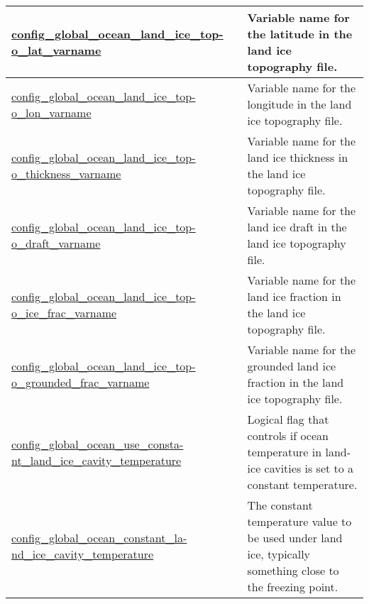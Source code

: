 {\begin{center}
\begin{longtable}{| p{2.0in} || p{4.0in} |}
    \hline
    \hyperref[subsec:nm_sec_config_global_ocean_land_ice_topo_lat_varname]{config\_global\_ocean\_land\_ice\_top-}\hyperref[subsec:nm_sec_config_global_ocean_land_ice_topo_lat_varname]{o\_lat\_varname}& Variable name for the latitude in the land ice topography file. \\
    \hline
    \hyperref[subsec:nm_sec_config_global_ocean_land_ice_topo_lon_varname]{config\_global\_ocean\_land\_ice\_top-}\hyperref[subsec:nm_sec_config_global_ocean_land_ice_topo_lon_varname]{o\_lon\_varname}& Variable name for the longitude in the land ice topography file. \\
    \hline
    \hyperref[subsec:nm_sec_config_global_ocean_land_ice_topo_thickness_varname]{config\_global\_ocean\_land\_ice\_top-}\hyperref[subsec:nm_sec_config_global_ocean_land_ice_topo_thickness_varname]{o\_thickness\_varname}& Variable name for the land ice thickness in the land ice topography file. \\
    \hline
    \hyperref[subsec:nm_sec_config_global_ocean_land_ice_topo_draft_varname]{config\_global\_ocean\_land\_ice\_top-}\hyperref[subsec:nm_sec_config_global_ocean_land_ice_topo_draft_varname]{o\_draft\_varname}& Variable name for the land ice draft in the land ice topography file. \\
    \hline
    \hyperref[subsec:nm_sec_config_global_ocean_land_ice_topo_ice_frac_varname]{config\_global\_ocean\_land\_ice\_top-}\hyperref[subsec:nm_sec_config_global_ocean_land_ice_topo_ice_frac_varname]{o\_ice\_frac\_varname}& Variable name for the land ice fraction in the land ice topography file. \\
    \hline
    \hyperref[subsec:nm_sec_config_global_ocean_land_ice_topo_grounded_frac_varname]{config\_global\_ocean\_land\_ice\_top-}\hyperref[subsec:nm_sec_config_global_ocean_land_ice_topo_grounded_frac_varname]{o\_grounded\_frac\_varname}& Variable name for the grounded land ice fraction in the land ice topography file. \\
    \hline
    \hyperref[subsec:nm_sec_config_global_ocean_use_constant_land_ice_cavity_temperature]{config\_global\_ocean\_use\_consta-}\hyperref[subsec:nm_sec_config_global_ocean_use_constant_land_ice_cavity_temperature]{nt\_land\_ice\_cavity\_temperature}& Logical flag that controls if ocean temperature in land-ice cavities is set to a constant temperature. \\
    \hline
    \hyperref[subsec:nm_sec_config_global_ocean_constant_land_ice_cavity_temperature]{config\_global\_ocean\_constant\_la-}\hyperref[subsec:nm_sec_config_global_ocean_constant_land_ice_cavity_temperature]{nd\_ice\_cavity\_temperature}& The constant temperature value to be used under land ice, typically something close to the freezing point. \\

\end{longtable}
\end{center}}
